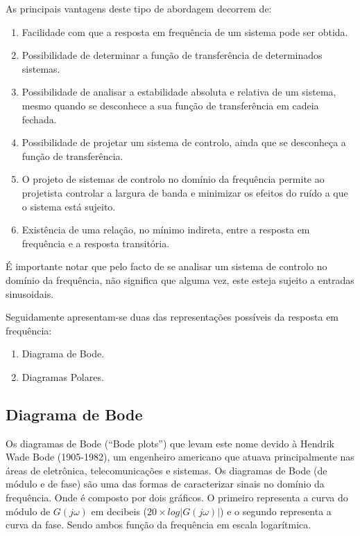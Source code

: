  



As principais vantagens deste tipo de abordagem decorrem de:
\begin{enumerate}
	\item Facilidade com que a resposta em frequência de um sistema pode ser obtida. 
	\item Possibilidade de determinar a função de transferência de determinados sistemas. 
	\item Possibilidade de analisar a estabilidade absoluta e relativa de um sistema, mesmo quando se desconhece a sua função de transferência em cadeia fechada.
	\item Possibilidade de projetar um sistema de controlo, ainda que se desconheça a função
	de transferência. 
	\item O projeto de sistemas de controlo no domínio da frequência permite ao projetista controlar a largura de banda e minimizar os efeitos do ruído a que o sistema está sujeito.
	\item Existência de uma relação, no mínimo indireta, entre a resposta em frequência e a resposta transitória. 
	
\end{enumerate}

É importante notar que pelo facto de se analisar um sistema de controlo no domínio da frequência, não significa que alguma vez, este esteja sujeito a entradas sinusoidais. 


Seguidamente apresentam-se duas das representações possíveis da resposta em frequência: 
\begin{enumerate}
	\item Diagrama de Bode.
	\item Diagramas Polares.
\end{enumerate}




\subsection{Diagrama de Bode}

Os diagramas de Bode (“Bode plots”) que levam este
nome devido à Hendrik Wade Bode (1905-1982), um engenheiro americano que atuava principalmente nas áreas de eletrônica, telecomunicações e sistemas. Os diagramas de Bode (de módulo e de fase) são uma das formas de caracterizar sinais no domínio da frequência. Onde é composto por dois gráficos. O primeiro representa a curva do módulo de $ G(j\omega) $ em decibeis ($ 20 \times log|G(j\omega)| $) e o segundo representa a curva da fase. Sendo ambos função da frequência em escala logarítmica.

